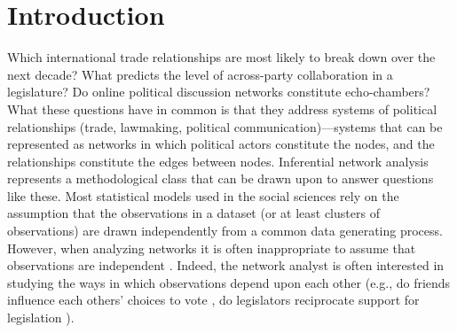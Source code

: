 \documentclass[fleqn,12pt]{wlscirep}
\title{\centering{Chapter 48 Outline\\
\large{Network Modeling: Estimation, Inference, Comparison, and Selection}
}}
{\centering
\author[1]{John P. Schoeneman}
\author[1]{Bruce A.  Desmarais}
\affil[1]{Penn State, Political Science, University Park, Pond Lab}
}
\begin{document}
\flushbottom
\maketitle{}
\vspace{-1.5cm}



\section{Introduction}

Which international trade relationships are most likely to break down over the next decade? What predicts the level of across-party collaboration in a legislature? Do online political discussion networks constitute echo-chambers? What these questions have in common is that they  address systems of political relationships (trade, lawmaking, political communication)---systems that can be represented as networks in which political actors constitute the nodes, and the relationships constitute the edges between nodes. Inferential network analysis represents a methodological class that can be drawn upon to answer questions like these. Most statistical models used in the social sciences rely on the assumption that the observations in a dataset (or at least clusters of observations) are drawn independently from a common data generating process.  However, when analyzing networks it is often inappropriate to assume that observations are independent \citep{harris2013communication,hafner2009network}. Indeed, the network analyst is often interested in studying the ways in which observations depend upon each other \citep{ogburn2018challenges} (e.g., do friends influence each others' choices to vote \citep{bond201261}, do legislators reciprocate support for legislation \citep{kirkland2014partisanship}). 
\end{document}
